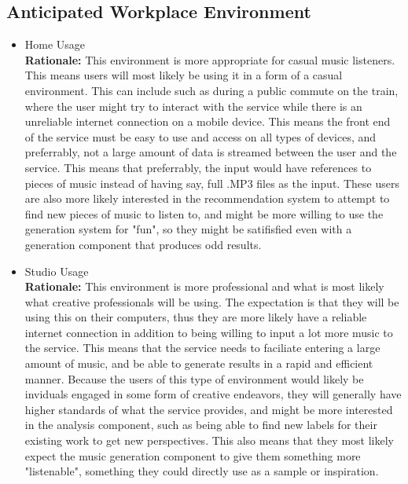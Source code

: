 \documentclass[12pt]{article}
\begin{document}
\subsection{Anticipated Workplace Environment}
\begin{itemize}
  \item Home Usage
  \\\textbf{Rationale:} This environment is more appropriate for casual music listeners. 
  This means users will most likely be using it in a form of a casual environment. This can 
  include such as during a public commute on the train, where the user might try to interact 
  with the service while there is an unreliable internet connection on a mobile device. This
  means the front end of the service must be easy to use and access on all types of devices, 
  and preferrably, not a large amount of data is streamed between the user and the service. 
  This means that preferrably, the input would have references to pieces of music instead of 
  having say, full .MP3 files as the input. These users are also more likely interested in the 
  recommendation system to attempt to find new pieces of music to listen to, and might be more
  willing to use the generation system for "fun", so they might be satifisfied even with a 
  generation component that produces odd results.
 
  \item Studio Usage
  \\\textbf{Rationale:} This environment is more professional and what is most likely what 
  creative professionals will be using. The expectation is that they will be using this on their 
  computers, thus they are more likely have a reliable internet connection in addition to being
  willing to input a lot more music to the service. This means that the service needs to faciliate 
  entering a large amount of music, and be able to generate results in a rapid and efficient 
  manner. Because the users of this type of environment would likely be inviduals engaged in some form
  of creative endeavors, they will generally have higher standards of what the service provides, and
  might be more interested in the analysis component, such as being able to find new labels for their
  existing work to get new perspectives. This also means that they most likely expect the music generation
  component to give them something more "listenable", something they could directly use as a sample or inspiration.  

\end{itemize}
\end{document}
